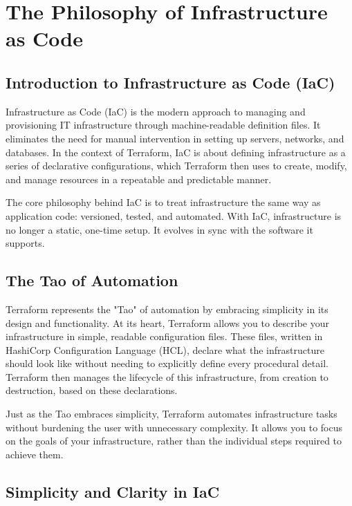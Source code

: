 \chapter{The Philosophy of Infrastructure as Code}

\sloppy

\section{Introduction to Infrastructure as Code (IaC)}

Infrastructure as Code (IaC) is the modern approach to managing and provisioning IT infrastructure through machine-readable definition files. It eliminates the need for manual intervention in setting up servers, networks, and databases. In the context of Terraform, IaC is about defining infrastructure as a series of declarative configurations, which Terraform then uses to create, modify, and manage resources in a repeatable and predictable manner.

The core philosophy behind IaC is to treat infrastructure the same way as application code: versioned, tested, and automated. With IaC, infrastructure is no longer a static, one-time setup. It evolves in sync with the software it supports.

\section{The Tao of Automation}

Terraform represents the "Tao" of automation by embracing simplicity in its design and functionality. At its heart, Terraform allows you to describe your infrastructure in simple, readable configuration files. These files, written in HashiCorp Configuration Language (HCL), declare what the infrastructure should look like without needing to explicitly define every procedural detail. Terraform then manages the lifecycle of this infrastructure, from creation to destruction, based on these declarations.

Just as the Tao embraces simplicity, Terraform automates infrastructure tasks without burdening the user with unnecessary complexity. It allows you to focus on the goals of your infrastructure, rather than the individual steps required to achieve them.

\section{Simplicity and Clarity in IaC}

